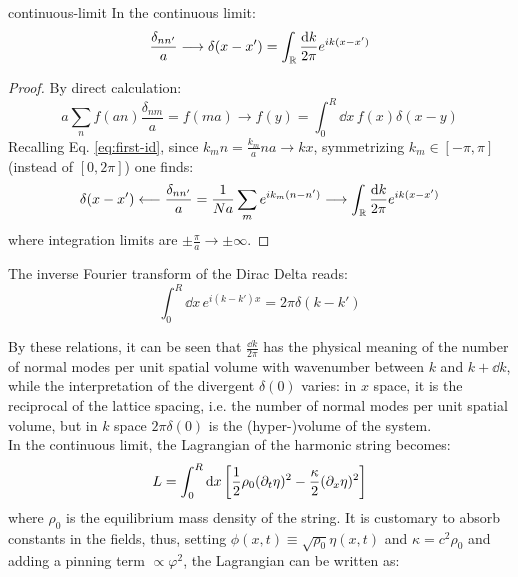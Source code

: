 \begin{proposition}{}{continuous-limit}
  In the continuous limit:
  \begin{equation*}
    \frac{\delta_{nn'}}{a} \longrightarrow \delta(x - x') = \int_{\mathbb{R}} \frac{\mathrm{d} k}{2\pi} e^{i k (x - x')}
  \end{equation*}
  \tcblower
\begin{proof}
  By direct calculation:
  \begin{equation*}
    a \sum_{n} f(an) \frac{\delta_{nm}}{a} = f(ma) \longrightarrow f(y) = \int_0^R \dd x\, f(x) \delta(x - y)
  \end{equation*}
  Recalling Eq. \ref{eq:first-id}, since $ k_m n = \frac{k_m}{a} na \rightarrow k x $, symmetrizing $ k_m \in [-\pi, \pi] $ (instead of $ [0, 2\pi] $) one finds:
  \begin{equation*}
    \delta(x - x') \longleftarrow \frac{\delta_{nn'}}{a} = \frac{1}{Na} \sum_{m} e^{ik_m (n - n')} \longrightarrow \int_{\mathbb{R}} \frac{\mathrm{d} k}{2\pi} e^{ik (x - x')}
  \end{equation*}
  where integration limits are $ \pm \frac{\pi}{a} \rightarrow \pm \infty $.
\end{proof}
\end{proposition}
\begin{proposition}{}{}
  The inverse Fourier transform of the Dirac Delta reads:
  \begin{equation*}
    \int_0^R \dd x\, e^{i (k - k') x} = 2\pi \delta(k - k')
  \end{equation*}
\end{proposition}
By these relations, it can be seen that $ \frac{\dd k}{2\pi} $ has the physical meaning of the number of normal modes per unit spatial volume with wavenumber between $ k $ and $ k + \dd k $, while the interpretation of the divergent $ \delta(0) $ varies: in $ x $ space, it is the reciprocal of the lattice spacing, i.e. the number of normal modes per unit spatial volume, but in $ k $ space $ 2\pi \delta(0) $ is the (hyper-)volume of the system.\\
In the continuous limit, the Lagrangian of the harmonic string becomes:
\begin{equation*}
  L = \int_0^R \mathrm{d} x \left[ \frac{1}{2} \rho_0 (\partial_t \eta)^2 - \frac{\kappa}{2} (\partial_x \eta)^2 \right]
\end{equation*}
where $ \rho_0 $ is the equilibrium mass density of the string. It is customary to absorb constants in the fields, thus, setting $ \phi(x,t) \equiv \sqrt{\rho_0} \eta(x,t) $ and $ \kappa = c^2 \rho_0 $ and adding a pinning term $ \propto \varphi^2 $, the Lagrangian can be written as:
